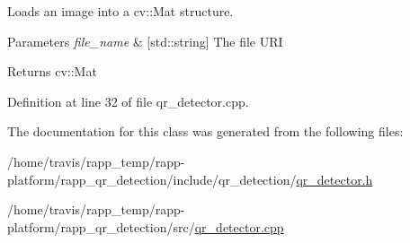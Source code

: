 Loads an image into a cv\-::\-Mat structure. 


\begin{DoxyParams}{Parameters}
{\em file\-\_\-name} & \mbox{[}std\-::string\mbox{]} The file U\-R\-I \\
\hline
\end{DoxyParams}
\begin{DoxyReturn}{Returns}
cv\-::\-Mat 
\end{DoxyReturn}


Definition at line 32 of file qr\-\_\-detector.\-cpp.



The documentation for this class was generated from the following files\-:\begin{DoxyCompactItemize}
\item 
/home/travis/rapp\-\_\-temp/rapp-\/platform/rapp\-\_\-qr\-\_\-detection/include/qr\-\_\-detection/\hyperlink{qr__detector_8h}{qr\-\_\-detector.\-h}\item 
/home/travis/rapp\-\_\-temp/rapp-\/platform/rapp\-\_\-qr\-\_\-detection/src/\hyperlink{qr__detector_8cpp}{qr\-\_\-detector.\-cpp}\end{DoxyCompactItemize}
